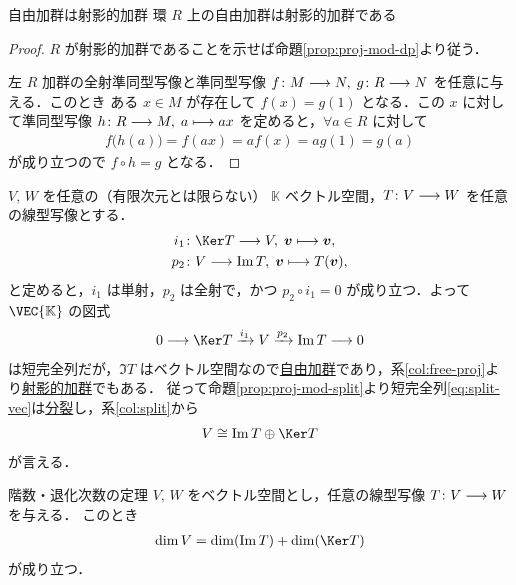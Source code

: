 \documentclass[geometry_main]{subfiles}
\begin{document}
\begin{mycol}[label=col:free-proj]{自由加群は射影的加群}
    環 $R$ 上の自由加群は射影的加群である
\end{mycol}

\begin{proof}
    $R$ が射影的加群であることを示せば命題\ref{prop:proj-mod-dp}より従う．

    左 $R$ 加群の全射準同型写像と準同型写像 $f \colon M \longrightarrow N,\; g\colon R \longrightarrow N$ を任意に与える．このとき
    ある $x \in M$ が存在して $f(x) = g(1)$ となる．この $x$ に対して準同型写像 $h \colon R \longrightarrow M,\; a \longmapsto ax$ を定めると，$\forall a \in R$ に対して
    \begin{align}
        f \bigl( h(a) \bigr)  = f(ax) = af(x) = ag(1) = g(a)
    \end{align}
    が成り立つので $f \circ h = g$ となる．
\end{proof}

$V,\, W$ を任意の（有限次元とは限らない） $\mathbb{K}$ ベクトル空間，$T \colon V \longrightarrow W$ を任意の線型写像とする．
\begin{align}
	i_1 &\colon \Ker T  \lto V,\; \bm{v} \lmto \bm{v}, \\
	p_2 &\colon V \lto \Im T,\; \bm{v} \lmto T(\bm{v}),
\end{align}
と定めると，$i_1$ は単射，$p_2$ は全射で，かつ $p_2 \circ i_1 = 0$ が成り立つ．よって $\VEC{\mathbb{K}}$ の図式
\begin{align}
	\label{eq:split-vec}
	0 \lto \Ker T \xrightarrow{i_1} V \xrightarrow{p_2} \Im T \lto 0
\end{align}
は短完全列だが，$\Im T$ はベクトル空間なので\hyperref[def:free-mod]{自由加群}であり，系\ref{col:free-proj}より\hyperref[def:proj-mod]{射影的加群}でもある．
従って命題\ref{prop:proj-mod-split}より短完全列\eqref{eq:split-vec}は\hyperref[def:split]{分裂}し，系\ref{col:split}から
\begin{align}
	V \cong \Im T \oplus \Ker T
\end{align}
が言える．

\begin{mytheo}[label=thm:rank-nullity]{階数・退化次数の定理}
	$V,\, W$ をベクトル空間とし，任意の線型写像 $T \colon V \longrightarrow W$ を与える．
	このとき
	\begin{align}
		\dim V = \dim (\Im T) + \dim (\Ker T)
	\end{align}
	が成り立つ．
\end{mytheo}
\end{document}
